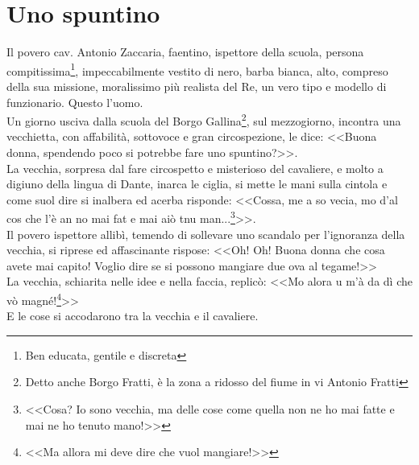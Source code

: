 
\chapter{Uno spuntino}
Il povero cav. Antonio Zaccaria, faentino, ispettore della scuola, persona compitissima\footnote{Ben educata, gentile e discreta}, impeccabilmente vestito di nero, barba bianca, alto, compreso della sua missione, moralissimo più realista del Re, un vero tipo e modello di funzionario. Questo l'uomo.\\
\indent Un giorno usciva dalla scuola del Borgo Gallina\footnote{Detto anche Borgo Fratti, è la zona a ridosso del fiume in vi Antonio Fratti}, sul mezzogiorno, incontra una vecchietta, con affabilità, sottovoce e gran circospezione, le dice: <<Buona donna, spendendo poco si potrebbe fare uno spuntino?>>.\\
\indent La vecchia, sorpresa dal fare circospetto e misterioso del cavaliere, e molto a digiuno della lingua di Dante, inarca le ciglia, si mette le mani sulla cintola e come suol dire si inalbera ed acerba risponde: <<Cossa, me a so vecia, mo d'al cos che l'è an no mai fat e mai aiò tnu man...\footnote{<<Cosa? Io sono vecchia, ma delle cose come quella non ne ho mai fatte e mai ne ho tenuto mano!>>}>>.\\
\indent Il povero ispettore allibì, temendo di sollevare uno scandalo per l'ignoranza della vecchia, si riprese ed affascinante rispose: <<Oh! Oh! Buona donna che cosa avete mai capito! Voglio dire se si possono mangiare due ova al tegame!>>\\
\indent La vecchia, schiarita nelle idee e nella faccia, replicò: <<Mo alora u m'à da dì che vò magné!\footnote{<<Ma allora mi deve dire che vuol mangiare!>>}>>\\
\indent E le cose si accodarono tra la vecchia e il cavaliere.

